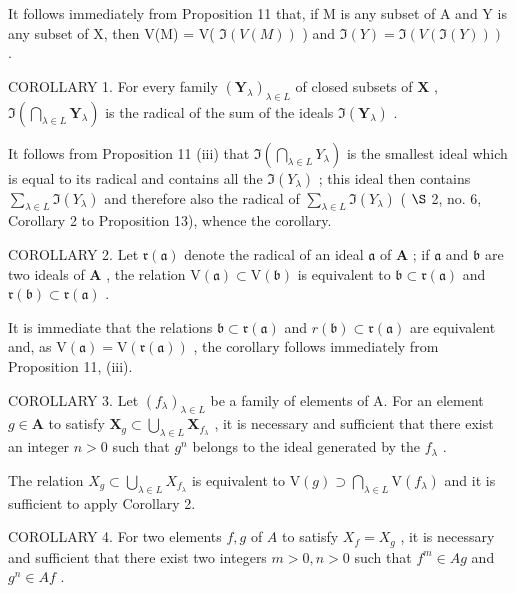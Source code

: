 It follows immediately from Proposition 11 that, if M is any subset of A and Y is any subset of X, then V(M) = V( \(\Im(V(M))\) ) and \(\Im(Y) = \Im(V(\Im(Y)))\) .

COROLLARY 1. For every family \((\mathbf{Y}_{\lambda})_{\lambda \in L}\) of closed subsets of \(\mathbf{X}\) , \(\Im\left(\bigcap_{\lambda \in L} \mathbf{Y}_{\lambda}\right)\) is the radical of the sum of the ideals \(\Im(\mathbf{Y}_{\lambda})\) .

It follows from Proposition 11 (iii) that \(\Im\left(\bigcap_{\lambda\in L}Y_{\lambda}\right)\) is the smallest ideal which is equal to its radical and contains all the \(\Im(Y_{\lambda})\) ; this ideal then contains \(\sum_{\lambda\in L}\Im(Y_{\lambda})\) and therefore also the radical of \(\sum_{\lambda\in L}\Im(Y_{\lambda})\) ( \(\S\) 2, no. 6, Corollary 2 to Proposition 13), whence the corollary.

COROLLARY 2. Let \(\mathfrak{r}(\mathfrak{a})\) denote the radical of an ideal \(\mathfrak{a}\) of \(\mathbf{A}\) ; if \(\mathfrak{a}\) and \(\mathfrak{b}\) are two ideals of \(\mathbf{A}\) , the relation \(\mathrm{V}(\mathfrak{a}) \subset \mathrm{V}(\mathfrak{b})\) is equivalent to \(\mathfrak{b} \subset \mathfrak{r}(\mathfrak{a})\) and \(\mathfrak{r}(\mathfrak{b}) \subset \mathfrak{r}(\mathfrak{a})\) .

It is immediate that the relations \(\mathfrak{b} \subset \mathfrak{r}(\mathfrak{a})\) and \(r(\mathfrak{b}) \subset \mathfrak{r}(\mathfrak{a})\) are equivalent and, as \(\mathrm{V}(\mathfrak{a}) = \mathrm{V}(\mathfrak{r}(\mathfrak{a}))\) , the corollary follows immediately from Proposition 11, (iii).

COROLLARY 3. Let \((f_{\lambda})_{\lambda \in L}\) be a family of elements of A. For an element \(g \in \mathbf{A}\) to satisfy \(\mathbf{X}_g \subset \bigcup_{\lambda \in L} \mathbf{X}_{f_\lambda}\) , it is necessary and sufficient that there exist an integer \(n > 0\) such that \(g^n\) belongs to the ideal generated by the \(f_\lambda\) .

The relation \(X_{g} \subset \bigcup_{\lambda \in L} X_{f_{\lambda}}\) is equivalent to \(\mathrm{V}(g) \supset \bigcap_{\lambda \in L} \mathrm{V}(f_{\lambda})\) and it is sufficient to apply Corollary 2.

COROLLARY 4. For two elements \(f, g\) of \(A\) to satisfy \(X_f = X_g\) , it is necessary and sufficient that there exist two integers \(m > 0, n > 0\) such that \(f^m \in Ag\) and \(g^n \in Af\) .

